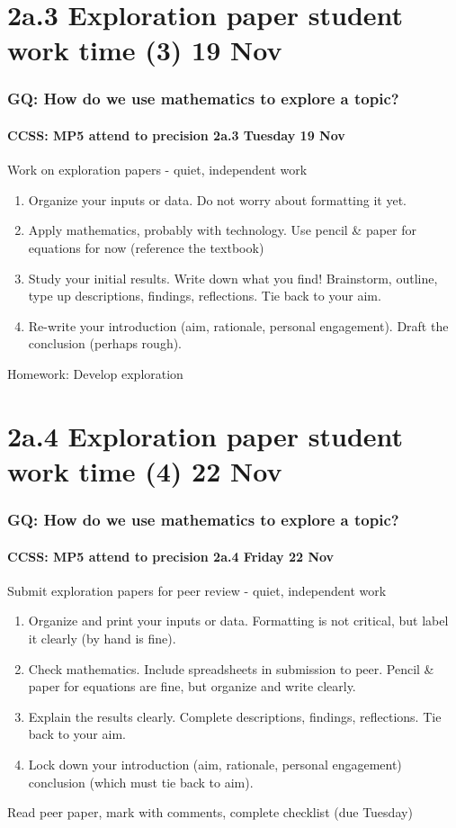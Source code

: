 \documentclass{beamer}
\begin{document}
\section{2a.3 Exploration paper student work time (3) 19 Nov}
\frame
{
  \frametitle{GQ: How do we use mathematics to explore a topic?}
  \framesubtitle{CCSS: MP5 attend to precision \hfill \alert{2a.3 Tuesday 19 Nov}}

  \begin{block}{Work on exploration papers - quiet, independent work}
  \begin{enumerate}
      \item Organize your inputs or data. Do not worry about formatting it yet. 
      \item Apply mathematics, probably with technology. Use pencil \& paper for equations for now (reference the textbook)
      \item Study your initial results. Write down what you find! Brainstorm, outline, type up descriptions, findings, reflections. Tie back to your aim.
      \item Re-write your introduction (aim, rationale, personal engagement). Draft the conclusion (perhaps rough). 
  \end{enumerate}
  \end{block}
  Homework: Develop exploration 
}

\section{2a.4 Exploration paper student work time (4) 22 Nov}
\frame
{
  \frametitle{GQ: How do we use mathematics to explore a topic?}
  \framesubtitle{CCSS: MP5 attend to precision \hfill \alert{2a.4 Friday 22 Nov}}
  \begin{block}{Submit exploration papers for peer review - quiet, independent work}
  \begin{enumerate}
      \item Organize and print your inputs or data. Formatting is not critical, but label it clearly (by hand is fine). 
      \item Check mathematics. Include spreadsheets in submission to peer. Pencil \& paper for equations are fine, but organize and write clearly.
      \item Explain the results clearly. Complete descriptions, findings, reflections. Tie back to your aim.
      \item Lock down your introduction (aim, rationale, personal engagement)  conclusion (which must tie back to aim). 
  \end{enumerate}
  \end{block}
  Read peer paper, mark with comments, complete checklist (due Tuesday) 
}
\end{document}
